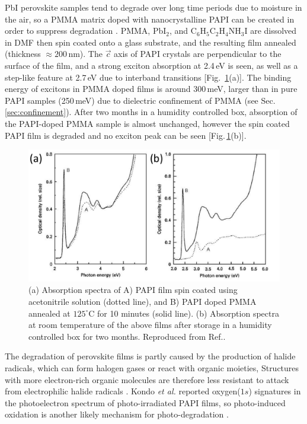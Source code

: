 PbI perovskite samples tend to degrade over long time periods due to moisture in the air, so a PMMA matrix doped with nanocrystalline PAPI can be created in order to suppress degradation \cite{Kitazawa1998}. %
PMMA, Pb$\textrm{I}_2$, and $\textrm{C}_6\textrm{H}_5\textrm{C}_2\textrm{H}_4\textrm{NH}_3\textrm{I}$ %
are dissolved in DMF then spin coated onto a glass substrate, and the resulting film annealed (thickness $\approx200$\,nm). The $\vec{c}$ axis of PAPI crystals are perpendicular to the surface of the film, and a strong exciton absorption at 2.4\,eV is seen, as well as a step-like feature at 2.7\,eV due to interband transitions [Fig.\ \ref{2Fig10}(a)]. The binding energy of excitons in PMMA doped films is around 300\,meV, larger than in pure PAPI samples (250\,meV) due to dielectric confinement of PMMA (see Sec.\,\ref{sec:confinement}). After two months in a humidity controlled box, absorption of the PAPI-doped PMMA sample is almost unchanged, however the spin coated PAPI film is degraded and no exciton peak can be seen [Fig.\,\ref{2Fig10}(b)].
\begin{figure}
\centering
\includegraphics[width=\textwidth]{Fig10}
\caption{ (a) Absorption spectra of A) PAPI film spin coated using acetonitrile solution (dotted line), and B) PAPI doped PMMA annealed at $125^{\circ}$C for 10 minutes (solid line). (b) Absorption spectra at room temperature of the above films after storage in a humidity controlled box for two months. Reproduced from Ref.\!.}
\label{2Fig10}
\end{figure}

The degradation of perovskite films is partly caused by the production of halide radicals, which can form halogen gases or react with organic moieties, Structures with more electron-rich organic molecules are therefore less resistant to attack from electrophilic halide radicals \cite{Wei2014}. Kondo \textit{et al.} reported oxygen($1s$) signatures in the photoelectron spectrum of photo-irradiated PAPI films, so photo-induced oxidation is another likely mechanism for photo-degradation \cite{Kitazawa2002}.

